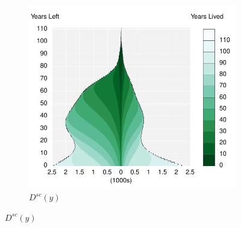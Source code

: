 \documentclass{article}
\begin{document}
\begin{figure}
\begin{subfigure}[b]{.48\linewidth}
    \includegraphics[scale=.55]{Figures/Deathsyx10USAExternal.pdf}
    \caption*{$D^{sc}(y)$ }
\end{subfigure}
\end{figure}
\end{document}
